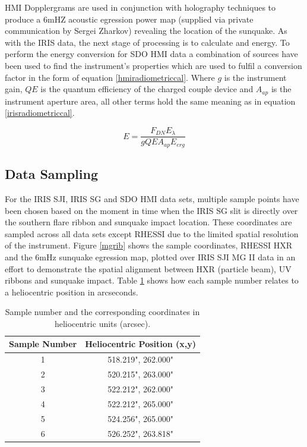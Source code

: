 HMI Dopplergrams are used in conjunction with holography techniques to produce a 6mHZ acoustic egression power map (supplied via private communication by Sergei Zharkov) revealing the location of the sunquake. 
As with the IRIS data, the next stage of processing is to calculate and energy. To perform the energy conversion for SDO HMI data a combination of sources \citep{2012SoPh..275...41B, 2012SoPh..275..285C} have been used to find the instrument's properties which are used to fulfil a conversion factor in the form of equation \ref{hmiradiometriccal}. Where $g$ is the instrument gain, $QE$ is the quantum efficiency of the charged couple device and $A_{ap}$ is the instrument aperture area, all other terms hold the same meaning as in equation \ref{irisradiometriccal}.

\begin{equation}\label{hmiradiometriccal}
E = \frac{F_{DN} E_{\lambda}}{g QE A_{ap} E_{erg}}
\end{equation}

\subsection{Data Sampling}
For the IRIS SJI, IRIS SG and SDO HMI data sets, multiple sample points have been chosen based on the moment in time when the IRIS SG slit is directly over the southern flare ribbon and sunquake impact location. These coordinates are sampled across all data sets except RHESSI due to the limited spatial resolution of the instrument. Figure \ref{mgrib} shows the sample coordinates, RHESSI HXR and the 6mHz sunquake egression map, plotted over IRIS SJI MG II data in an effort to demonstrate the spatial alignment between HXR (particle beam), UV ribbons and sunquake impact. Table \ref{coordtab} shows how each sample number relates to a heliocentric position in arcseconds.
\centering

\begin{table}
\begin{tabular}{|c|c|}
\hline
Sample Number & Heliocentric Position (x,y)\\
\hline
1 & 518.219", 262.000"\\
2 & 520.215", 263.000"\\
3 & 522.212", 262.000"\\
4 & 522.212", 265.000"\\
5 & 524.256", 265.000"\\
6 & 526.252", 263.818"\\
\hline
\end{tabular}
\caption{Sample number and the corresponding coordinates in heliocentric units (arcsec).}\label{coordtab}
\end{table}

